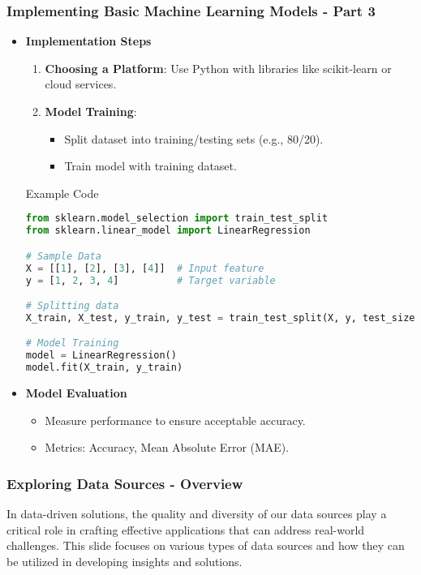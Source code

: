 \documentclass[aspectratio=169]{beamer}
\begin{document}
\begin{frame}[fragile]
    \frametitle{Implementing Basic Machine Learning Models - Part 3}
    
    \begin{itemize}
        \item \textbf{Implementation Steps}
            \begin{enumerate}
                \item \textbf{Choosing a Platform}: Use Python with libraries like scikit-learn or cloud services.
                \item \textbf{Model Training}: 
                    \begin{itemize}
                        \item Split dataset into training/testing sets (e.g., 80/20).
                        \item Train model with training dataset.
                    \end{itemize}
            \end{enumerate}
            \begin{block}{Example Code}
            \begin{lstlisting}[language=Python]
from sklearn.model_selection import train_test_split
from sklearn.linear_model import LinearRegression

# Sample Data
X = [[1], [2], [3], [4]]  # Input feature
y = [1, 2, 3, 4]          # Target variable

# Splitting data
X_train, X_test, y_train, y_test = train_test_split(X, y, test_size=0.2)

# Model Training
model = LinearRegression()
model.fit(X_train, y_train)
            \end{lstlisting}
            \end{block}
        \item \textbf{Model Evaluation}
            \begin{itemize}
                \item Measure performance to ensure acceptable accuracy.
                \item Metrics: Accuracy, Mean Absolute Error (MAE).
            \end{itemize}
    \end{itemize}
\end{frame}

\begin{frame}[fragile]
    \frametitle{Exploring Data Sources - Overview}
    In data-driven solutions, the quality and diversity of our data sources play a critical role in crafting effective applications that can address real-world challenges. This slide focuses on various types of data sources and how they can be utilized in developing insights and solutions.
\end{frame}
\end{document}
